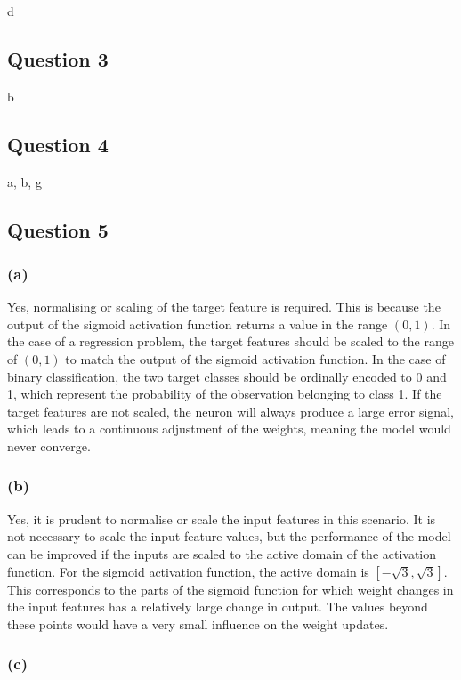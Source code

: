 \documentclass[10pt]{article}
\begin{document}
d

\subsection*{Question 3}

b

\subsection*{Question 4}

a, b, g

\subsection*{Question 5}

\subsubsection*{(a)}

Yes, normalising or scaling of the target feature is required. This is because the output of the sigmoid
activation function returns a value in the range $(0,1)$. In the case of a regression problem, the target features should
be scaled to the range of $(0,1)$ to match the output of the sigmoid activation function. In the case of binary classification,
the two target classes should be ordinally encoded to 0 and 1, which represent the probability of the observation belonging to class 1.
If the target features are not scaled, the neuron will always produce a large error signal, which leads to a continuous adjustment of the
weights, meaning the model would never converge.

\subsubsection*{(b)}

Yes, it is prudent to normalise or scale the input features in this scenario. It is not necessary to scale the input
feature values, but the performance of the model can be improved if the inputs are scaled to the active domain of the
activation function. For the sigmoid activation function, the active domain is $[-\sqrt{3}, \sqrt{3}]$. This corresponds
to the parts of the sigmoid function for which weight changes in the input features has a relatively large change
in output. The values beyond these points would have a very small influence on the weight updates.

\subsubsection*{(c)}
\end{document}
